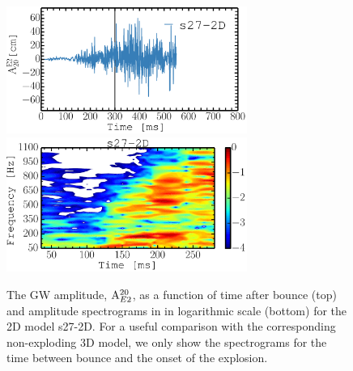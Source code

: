 \begin{figure}
\centering
\includegraphics[width=0.7\textwidth]{./images/paper1/fig8a.pdf} \\
\includegraphics[width=0.7\textwidth]{./images/paper1/fig8b.pdf} 
\caption{The GW amplitude, $\mathrm{A}_{\mathrm\mathrm{E2}}^{\mathrm{20}}$, as a function of time after bounce (top)
and amplitude spectrograms in in logarithmic scale (bottom) for the 2D model s27-2D. 
For a useful comparison with the corresponding non-exploding 3D model, we only
show the spectrograms for the time between bounce and the onset of the explosion.
\label{fig:s272d}}
\end{figure}


